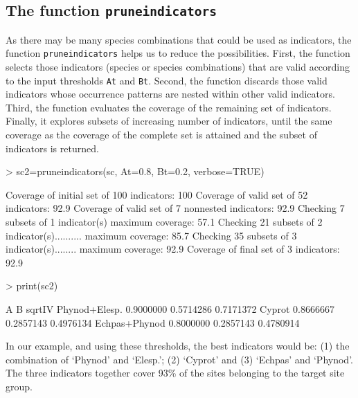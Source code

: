 \documentclass[11pt,a4paper]{article}
\begin{document}
\subsection{The function \texttt{pruneindicators}}
As there may be many species combinations that could be used as indicators, the function \texttt{pruneindicators} helps us to reduce the possibilities. First, the function selects those indicators (species or species combinations) that are valid according to the input thresholds \texttt{At} and \texttt{Bt}. Second, the function discards those valid indicators whose occurrence patterns are nested within other valid indicators. Third, the function evaluates the coverage of the remaining set of indicators. Finally, it explores subsets of increasing number of indicators, until the same coverage as the coverage of the complete set is attained and the subset of indicators is returned.
\begin{Schunk}
\begin{Sinput}
> sc2=pruneindicators(sc, At=0.8, Bt=0.2, verbose=TRUE)
\end{Sinput}
\begin{Soutput}
Coverage of initial set of 100 indicators: 100%
Coverage of valid set of 52 indicators: 92.9%
Coverage of valid set of 7 nonnested indicators: 92.9%
Checking 7 subsets of 1 indicator(s) maximum coverage: 57.1%
Checking 21 subsets of 2 indicator(s).......... maximum coverage: 85.7%
Checking 35 subsets of 3 indicator(s)........ maximum coverage: 92.9%
Coverage of final set of 3 indicators: 92.9%
\end{Soutput}
\begin{Sinput}
> print(sc2)
\end{Sinput}
\begin{Soutput}
                      A         B    sqrtIV
Phynod+Elesp. 0.9000000 0.5714286 0.7171372
Cyprot        0.8666667 0.2857143 0.4976134
Echpas+Phynod 0.8000000 0.2857143 0.4780914
\end{Soutput}
\end{Schunk}
In our example, and using these thresholds, the best indicators would be: (1) the combination of `Phynod' and `Elesp.'; (2) `Cyprot' and (3) `Echpas' and `Phynod'. The three indicators together cover 93\% of the sites belonging to the target site group.
\end{document}
